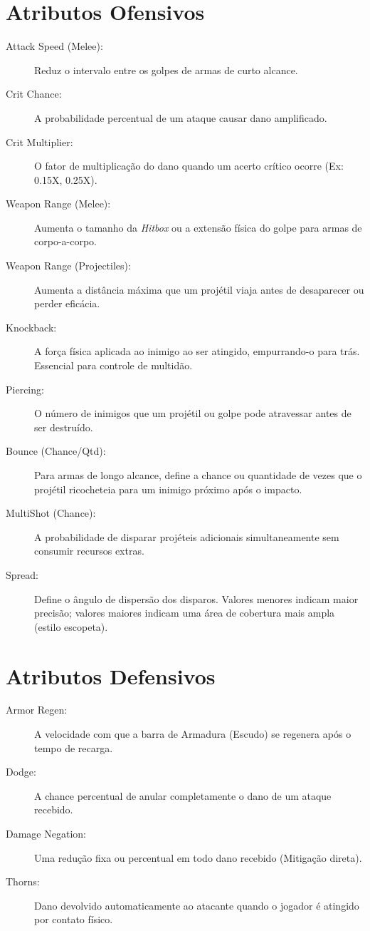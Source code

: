 \documentclass[a4paper,12pt]{report}
\begin{document}
\section{Atributos Ofensivos}
\begin{description}
    \item[Attack Speed (Melee):] Reduz o intervalo entre os golpes de armas de curto alcance.
    \item[Crit Chance:] A probabilidade percentual de um ataque causar dano amplificado.
    \item[Crit Multiplier:] O fator de multiplicação do dano quando um acerto crítico ocorre (Ex: 0.15X, 0.25X).
    \item[Weapon Range (Melee):] Aumenta o tamanho da \textit{Hitbox} ou a extensão física do golpe para armas de corpo-a-corpo.
    \item[Weapon Range (Projectiles):] Aumenta a distância máxima que um projétil viaja antes de desaparecer ou perder eficácia.
    \item[Knockback:] A força física aplicada ao inimigo ao ser atingido, empurrando-o para trás. Essencial para controle de multidão.
    \item[Piercing:] O número de inimigos que um projétil ou golpe pode atravessar antes de ser destruído.
    \item[Bounce (Chance/Qtd):] Para armas de longo alcance, define a chance ou quantidade de vezes que o projétil ricocheteia para um inimigo próximo após o impacto.
    \item[MultiShot (Chance):] A probabilidade de disparar projéteis adicionais simultaneamente sem consumir recursos extras.
    \item[Spread:] Define o ângulo de dispersão dos disparos. Valores menores indicam maior precisão; valores maiores indicam uma área de cobertura mais ampla (estilo escopeta).
\end{description}

\section{Atributos Defensivos}
\begin{description}
    \item[Armor Regen:] A velocidade com que a barra de Armadura (Escudo) se regenera após o tempo de recarga.
    \item[Dodge:] A chance percentual de anular completamente o dano de um ataque recebido.
    \item[Damage Negation:] Uma redução fixa ou percentual em todo dano recebido (Mitigação direta).
    \item[Thorns:] Dano devolvido automaticamente ao atacante quando o jogador é atingido por contato físico.
\end{description}
\end{document}

